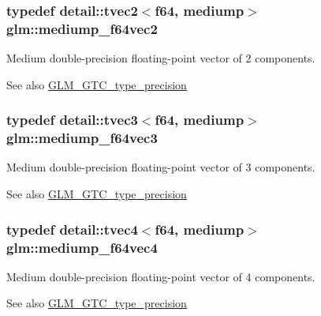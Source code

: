\subsubsection[{\texorpdfstring{mediump\+\_\+f64vec2}{mediump_f64vec2}}]{\setlength{\rightskip}{0pt plus 5cm}typedef detail\+::tvec2$<$f64, mediump$>$ {\bf glm\+::mediump\+\_\+f64vec2}}\hypertarget{group__gtc__type__precision_ga892891863b8e50195e3e48077a329335}{}\label{group__gtc__type__precision_ga892891863b8e50195e3e48077a329335}
Medium double-\/precision floating-\/point vector of 2 components. \begin{DoxySeeAlso}{See also}
\hyperlink{group__gtc__type__precision}{G\+L\+M\+\_\+\+G\+T\+C\+\_\+type\+\_\+precision} 
\end{DoxySeeAlso}
\subsubsection[{\texorpdfstring{mediump\+\_\+f64vec3}{mediump_f64vec3}}]{\setlength{\rightskip}{0pt plus 5cm}typedef detail\+::tvec3$<$f64, mediump$>$ {\bf glm\+::mediump\+\_\+f64vec3}}\hypertarget{group__gtc__type__precision_gae2832f9acbf0cc1071fcf93336db6e0c}{}\label{group__gtc__type__precision_gae2832f9acbf0cc1071fcf93336db6e0c}
Medium double-\/precision floating-\/point vector of 3 components. \begin{DoxySeeAlso}{See also}
\hyperlink{group__gtc__type__precision}{G\+L\+M\+\_\+\+G\+T\+C\+\_\+type\+\_\+precision} 
\end{DoxySeeAlso}
\subsubsection[{\texorpdfstring{mediump\+\_\+f64vec4}{mediump_f64vec4}}]{\setlength{\rightskip}{0pt plus 5cm}typedef detail\+::tvec4$<$f64, mediump$>$ {\bf glm\+::mediump\+\_\+f64vec4}}\hypertarget{group__gtc__type__precision_ga0e011facac062fd7fb9b40c7d8288310}{}\label{group__gtc__type__precision_ga0e011facac062fd7fb9b40c7d8288310}
Medium double-\/precision floating-\/point vector of 4 components. \begin{DoxySeeAlso}{See also}
\hyperlink{group__gtc__type__precision}{G\+L\+M\+\_\+\+G\+T\+C\+\_\+type\+\_\+precision} 
\end{DoxySeeAlso}
